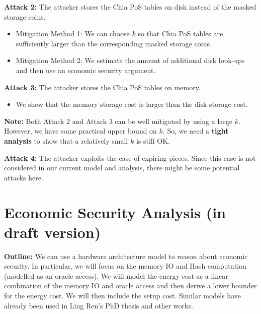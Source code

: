 \documentclass[12pt,draftcls,onecolumn]{IEEEtran}
\begin{document}
{\bf Attack 2:} The attacker stores the Chia PoS tables on disk instead of the masked storage coins.

\begin{itemize}
    \item Mitigation Method 1: We can choose $k$ so that Chia PoS tables are sufficiently larger than the corresponding masked storage coins.
    \item Mitigation Method 2: We estimate the amount of additional disk look-ups and then use an economic security argument.
\end{itemize}

{\bf Attack 3:} The attacker stores the Chia PoS tables on memory.

\begin{itemize}
    \item We show that the memory storage cost is larger than the disk storage cost.
\end{itemize}

{\bf Note:} Both Attack 2 and Attack 3 can be well mitigated by using a large $k$. However, we have some practical upper bound on $k$. So, we need a {\bf tight analysis} to show that a relatively small $k$ is still OK.

{\bf Attack 4:} The attacker exploits the case of expiring pieces. Since this case is not considered in our current model and analysis, there might be some potential attacks here.



\section{Economic Security Analysis (in draft version)}


{\bf Outline:} We can use a hardware architecture model to reason about economic security. In particular, we will focus on the memory IO and Hash computation (modelled as an oracle access). We will model the energy cost as a linear combination of the memory IO and oracle access and then derive a lower bounder for the energy cost. We will then include the setup cost. Similar models have already been used in Ling Ren's PhD thesis and other works.
\end{document}
